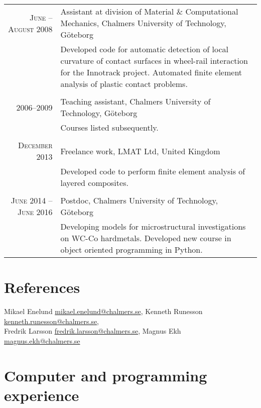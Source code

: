 \documentclass[a4paper,10pt]{article} %
\begin{document}
{\begin{tabular}{r|p{11cm}}
\textsc{June -- August 2008} & Assistant at division of Material \& Computational Mechanics, Chalmers University of Technology, Göteborg\\
& \footnotesize{Developed code for automatic detection of local curvature of contact surfaces in wheel-rail interaction for the Innotrack project. Automated finite element analysis of plastic contact problems.}\\
\multicolumn{2}{c}{} \\
\textsc{2006--2009} & Teaching assistant, Chalmers University of Technology, Göteborg\\
& \footnotesize{Courses listed subsequently.}\\
\multicolumn{2}{c}{} \\
\textsc{December 2013} & Freelance work, LMAT Ltd, United Kingdom\\
& \footnotesize{Developed code to perform finite element analysis of layered composites.}\\
\multicolumn{2}{c}{} \\
\textsc{June 2014 -- June 2016} & Postdoc, Chalmers University of Technology, Göteborg\\
& \footnotesize{Developing models for microstructural investigations on WC-Co hardmetals.
  Developed new course in object oriented programming in Python.}\\

\end{tabular}


\section{References}
Mikael Enelund \href{mailto:mikael.enelund@chalmers.se}{mikael.enelund@chalmers.se}, 
Kenneth Runesson \href{mailto:kenneth.runesson@chalmers.se}{kenneth.runesson@chalmers.se},\\
Fredrik Larsson \href{mailto:fredrik.larsson@chalmers.se}{fredrik.larsson@chalmers.se},
Magnus Ekh \href{mailto:magnus.ekh@chalmers.se}{magnus.ekh@chalmers.se}



\newpage
\section{Computer and programming experience}

}
\end{document}
